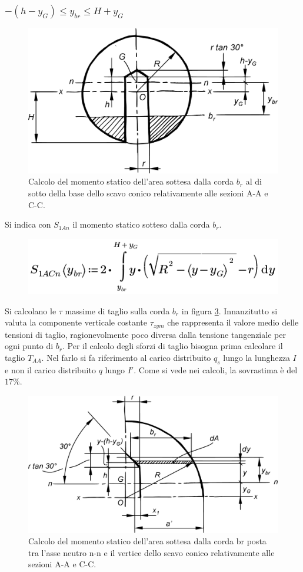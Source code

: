 \subsubsection{$-(h-y_G) \leq y_{br} \leq H+y_G$}
\begin{figure}[H]
\centering
  \includegraphics[width=.4\textwidth]{imgs/Cap7/SezAsse6}
\caption{Calcolo del momento statico dell'area sottesa dalla corda $b_r$ al di sotto della base dello scavo conico relativamente alle sezioni A-A e C-C.}
\label{fig:SezAsse6}
\end{figure}
Si indica con $S_{1An}$ il momento statico sotteso dalla corda $b_r$. 
\begin{figure}[H]
\centering
  \includegraphics[width=.4\textwidth]{imgs/MathAsse4_0}
\caption{}
\label{fig:MathAsse4_0}
\end{figure}
Si calcolano le $\tau$ massime di taglio sulla corda $b_r$ in figura \ref{fig:SezAsse7}.
Innanzitutto si valuta la componente verticale costante $\tau_{zym}$ che rappresenta il valore medio delle tensioni di taglio, ragionevolmente poco diversa dalla tensione tangenziale per ogni punto di $b_r$. 
Per il calcolo degli sforzi di taglio bisogna prima calcolare il taglio $T_{AA}$. Nel farlo si fa riferimento al carico distribuito $q_s$ lungo la lunghezza $I$ e non il carico distribuito $q$ lungo $I'$. Come si vede nei calcoli, la sovrastima è del $17\%$. 
\begin{figure}[H]
\centering
  \includegraphics[width=.45\textwidth]{imgs/Cap7/SezAsse7}
\caption{Calcolo del momento statico dell’area sottesa dalla corda br posta tra l’asse neutro n-n e il vertice dello scavo conico relativamente alle sezioni A-A e C-C.}
\label{fig:SezAsse7}
\end{figure}
